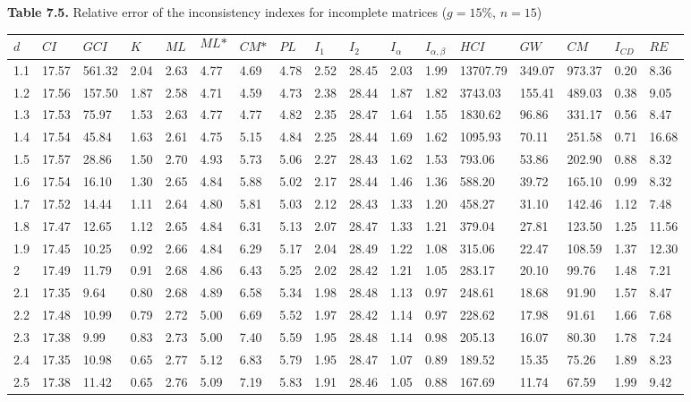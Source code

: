 \newpage\textbf{Table 7.5.} Relative error of the inconsistency indexes for incomplete matrices ($g=15\%$, $n=15$)
\begin{adjustbox}{angle=90}
  \begin{center}
    \begin{tabular}{|l|llllllllllllllll|}
      \hline $d$ &
$\textit{CI}$&$\textit{GCI}$&$K$&$\textit{ML}$&$$\textit{ML*}$$&$\textit{CM*}$&$\textit{PL}$&$\textit{I}_1$&$\textit{I}_2$&$\textit{I}_{\alpha}$&$\textit{I}_{\alpha,\beta}$&$\textit{HCI}$&$\textit{GW}$&$\textit{CM}$&$\textit{I}_{CD}$&$\textit{RE}$\\ \hline \hline
1.1&17.57&561.32&2.04&2.63&4.77&4.69&4.78&2.52&28.45&2.03&1.99&13707.79&349.07&973.37&0.20&8.36  \\ 
1.2&17.56&157.50&1.87&2.58&4.71&4.59&4.73&2.38&28.44&1.87&1.82&3743.03&155.41&489.03&0.38&9.05  \\ 
1.3&17.53&75.97&1.53&2.63&4.77&4.77&4.82&2.35&28.47&1.64&1.55&1830.62&96.86&331.17&0.56&8.47  \\ 
1.4&17.54&45.84&1.63&2.61&4.75&5.15&4.84&2.25&28.44&1.69&1.62&1095.93&70.11&251.58&0.71&16.68  \\ 
1.5&17.57&28.86&1.50&2.70&4.93&5.73&5.06&2.27&28.43&1.62&1.53&793.06&53.86&202.90&0.88&8.32  \\ 
1.6&17.54&16.10&1.30&2.65&4.84&5.88&5.02&2.17&28.44&1.46&1.36&588.20&39.72&165.10&0.99&8.32  \\ 
1.7&17.52&14.44&1.11&2.64&4.80&5.81&5.03&2.12&28.43&1.33&1.20&458.27&31.10&142.46&1.12&7.48  \\ 
1.8&17.47&12.65&1.12&2.65&4.84&6.31&5.13&2.07&28.47&1.33&1.21&379.04&27.81&123.50&1.25&11.56  \\ 
1.9&17.45&10.25&0.92&2.66&4.84&6.29&5.17&2.04&28.49&1.22&1.08&315.06&22.47&108.59&1.37&12.30  \\ 
2&17.49&11.79&0.91&2.68&4.86&6.43&5.25&2.02&28.42&1.21&1.05&283.17&20.10&99.76&1.48&7.21  \\ 
2.1&17.35&9.64&0.80&2.68&4.89&6.58&5.34&1.98&28.48&1.13&0.97&248.61&18.68&91.90&1.57&8.47  \\ 
2.2&17.48&10.99&0.79&2.72&5.00&6.69&5.52&1.97&28.42&1.14&0.97&228.62&17.98&91.61&1.66&7.68  \\ 
2.3&17.38&9.99&0.83&2.73&5.00&7.40&5.59&1.95&28.48&1.14&0.98&205.13&16.07&80.30&1.78&7.24  \\ 
2.4&17.35&10.98&0.65&2.77&5.12&6.83&5.79&1.95&28.47&1.07&0.89&189.52&15.35&75.26&1.89&8.23  \\ 
2.5&17.38&11.42&0.65&2.76&5.09&7.19&5.83&1.91&28.46&1.05&0.88&167.69&11.74&67.59&1.99&9.42  \\ 

\end{tabular}
\end{center}
\end{adjustbox}
